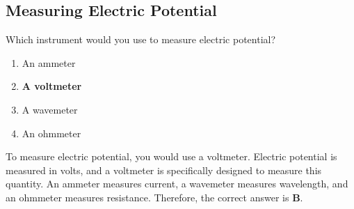 \subsection{Measuring Electric Potential}
\label{T7D01}

\begin{tcolorbox}[colback=gray!10!white,colframe=black!75!black,title=T7D01]
Which instrument would you use to measure electric potential?
\begin{enumerate}[noitemsep]
    \item An ammeter
    \item \textbf{A voltmeter}
    \item A wavemeter
    \item An ohmmeter
\end{enumerate}
\end{tcolorbox}

To measure electric potential, you would use a voltmeter. Electric potential is measured in volts, and a voltmeter is specifically designed to measure this quantity. An ammeter measures current, a wavemeter measures wavelength, and an ohmmeter measures resistance. Therefore, the correct answer is \textbf{B}.